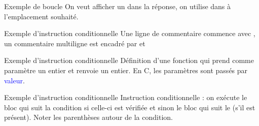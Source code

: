\documentclass[10pt]{beamer}
\begin{document}
\begin{frame}{\Ctitle}{\stitle}
	\begin{exampleblock}{Exemple de boucle}
	\medskip
	On veut afficher un  dans la réponse, on utilise  dans  à l'emplacement souhaité.
	\end{exampleblock}
\end{frame}

\begin{frame}{\Ctitle}{\stitle}
	\begin{exampleblock}{Exemple d'instruction conditionnelle}
	\medskip
	Une ligne de commentaire commence avec \kw{//}, un commentaire multiligne est encadré par \kw{/*} et \kw{*/}
	\end{exampleblock}
\end{frame}

\begin{frame}{\Ctitle}{\stitle}
	\begin{exampleblock}{Exemple d'instruction conditionnelle}
	\medskip
	Définition d'une fonction  qui prend comme paramètre un entier et renvoie un entier. 
	\textcolor{BrickRed}{\important} En C, les paramètres sont passés par \textcolor{blue}{valeur}.
	\end{exampleblock}
\end{frame}

\begin{frame}{\Ctitle}{\stitle}
	\begin{exampleblock}{Exemple d'instruction conditionnelle}
	\medskip
	Instruction conditionnelle : on exécute le bloc qui suit la condition si celle-ci est vérifiée et sinon le bloc qui suit le  (s'il est présent).
	Noter les parenthèses autour de la condition.
	\end{exampleblock}
\end{frame}
\end{document}
